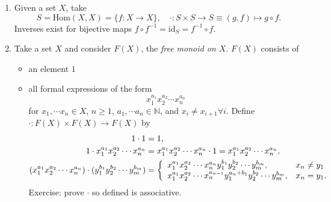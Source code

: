 \begin{xmpl}
  \begin{enumerate}
    \item{Given a set $X$, take
          $$
          S = \mathrm{Hom}(X, X) = \{f : X \to X\}, \quad
          \cdot : S \times S \to S \equiv (g, f) \mapsto g \circ f.
          $$
          Inverses exist for bijective maps
          $f \circ f^{-1} = \mathrm{id}_S = f^{-1} \circ f$.
         }
    \item{Take a set $X$ and consider $F(X)$, the \emph{free monoid on $X$}.
          $F(X)$ consists of
          \begin{itemize}
            \item{an element $1$}
            \item{all formal expressions of the form
                  $$
                  x_1^{a_1} x_2^{a_2} \cdots x_n^{a_n}
                  $$
                  for $x_1, \cdots x_n \in X$, $n \geq 1$,
                  $a_1, \cdots a_n \in \mathbb{N}$, and
                  $x_i \neq x_{i+1} \forall i$.
                  Define $\cdot : F(X) \times F(X) \to F(X)$ by
                  \begin{align*}
                    1 \cdot 1 &= 1, \\
                    1 \cdot x_1^{a_1} x_2^{a_2} \cdots x_n^{a_n}
                    & = x_1^{a_1} x_2^{a_2} \cdots x_n^{a_n} \cdot 1
                      = x_1^{a_1} x_2^{a_2} \cdots x_n^{a_n}, \\
                    (x_1^{a_1} x_2^{a_2} \cdots x_n^{a_n}) \cdot
                    (y_1^{b_1} y_2^{b_2} \cdots y_m^{b_m})
                    & = \left\{
                          \begin{array}{l l}
                            x_1^{a_1} x_2^{a_2} \cdots x_n^{a_n}
                            y_1^{b_1} y_2^{b_2} \cdots y_m^{b_m},      & x_n \neq y_1 \\
                            x_1^{a_1} x_2^{a_2} \cdots x_n^{a_{n-1}}
                            y_1^{a_n + b_1} y_2^{b_2} \cdots y_m^{b_m}, & x_n = y_1.
                          \end{array}
                        \right.
                  \end{align*}
                  Exercise: prove $\cdot$ so defined is associative.
                }
          \end{itemize}
         }
  \end{enumerate}
\end{xmpl}
